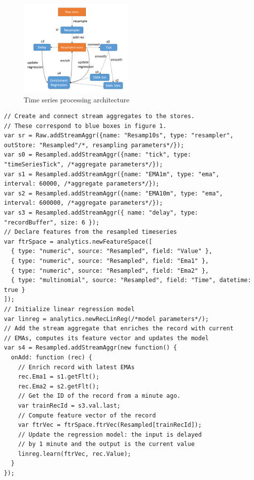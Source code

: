 \documentclass{article} %
\begin{document}
\begin{figure}[h]
\begin{center}
\includegraphics[width=0.5\textwidth]{timeSeries2.PNG}
\end{center}
\caption{Time series processing architecture}\label{fig:timeSeries}
\end{figure}

\begin{lstlisting}[caption=Time series processing] 	
// Create and connect stream aggregates to the stores.
// These correspond to blue boxes in figure 1.
var sr = Raw.addStreamAggr({name: "Resamp10s", type: "resampler", outStore: "Resampled"/*, resampling parameters*/});
var s0 = Resampled.addStreamAggr({name: "tick", type: "timeSeriesTick", /*aggregate parameters*/});
var s1 = Resampled.addStreamAggr({name: "EMA1m", type: "ema", interval: 60000, /*aggregate parameters*/});
var s2 = Resampled.addStreamAggr({name: "EMA10m", type: "ema", interval: 600000, /*aggregate parameters*/});
var s3 = Resampled.addStreamAggr({ name: "delay", type: "recordBuffer", size: 6 });
// Declare features from the resampled timeseries
var ftrSpace = analytics.newFeatureSpace([
  { type: "numeric", source: "Resampled", field: "Value" },
  { type: "numeric", source: "Resampled", field: "Ema1" },
  { type: "numeric", source: "Resampled", field: "Ema2" },
  { type: "multinomial", source: "Resampled", field: "Time", datetime: true }
]);
// Initialize linear regression model
var linreg = analytics.newRecLinReg(/*model parameters*/);
// Add the stream aggregate that enriches the record with current
// EMAs, computes its feature vector and updates the model
var s4 = Resampled.addStreamAggr(new function() {
  onAdd: function (rec) {
    // Enrich record with latest EMAs
    rec.Ema1 = s1.getFlt();
    rec.Ema2 = s2.getFlt();
    // Get the ID of the record from a minute ago.
    var trainRecId = s3.val.last;
    // Compute feature vector of the record
    var ftrVec = ftrSpace.ftrVec(Resampled[trainRecId]);
    // Update the regression model: the input is delayed
    // by 1 minute and the output is the current value
    linreg.learn(ftrVec, rec.Value);
  }
});
\end{lstlisting}
\end{document}
